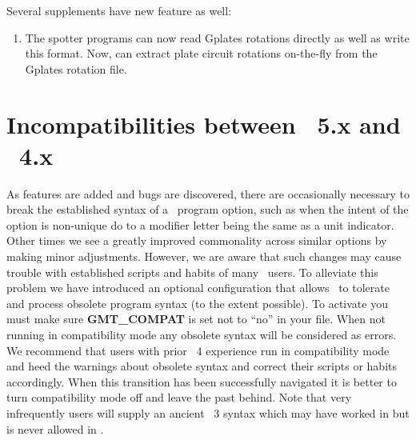 \begin{enumerate}
\end{enumerate}

Several supplements have new feature as well:

\begin{enumerate}
	\item The spotter programs can now read Gplates rotations directly as well as write this format.
		Now,  can extract plate circuit rotations on-the-fly from the Gplates rotation file.
\end{enumerate}

\section{Incompatibilities between \gmt\ 5.x and \gmt\ 4.x}

As features are added and bugs are discovered, there are occasionally necessary to break
the established syntax of a \gmt\ program option, such as when the intent of the option
is non-unique do to a modifier letter being the same as a unit indicator.  Other times we see a greatly improved
commonality across similar options by making minor adjustments.  However, we are aware that
such changes may cause trouble with established scripts and habits of many \gmt\ users.
To alleviate this problem we have introduced an optional configuration that allows \gmt\ to
tolerate and process obsolete program syntax (to the extent possible).  To activate you must
make sure {\bf GMT\_COMPAT} is set not to ``no'' in your  file.  When not
running in compatibility mode any obsolete syntax will be considered as errors.  We recommend
that users with prior \gmt\ 4 experience run \gmt \5 in compatibility mode and heed the warnings
about obsolete syntax and correct their scripts or habits accordingly.  When this transition
has been successfully navigated it is better to turn compatibility mode off and leave the
past behind.  Note that very infrequently users will supply an ancient \gmt\ 3 syntax which
may have worked in  but is never allowed in .

